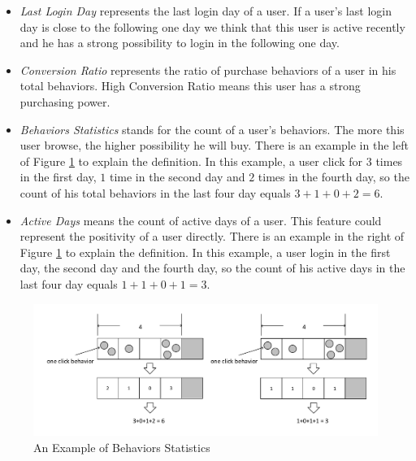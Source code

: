 \documentclass{llncs}
\begin{document}
\begin{itemize}
	\item \emph{Last Login Day} represents the last login day of a user.
	If a user's last login day is close to the following one day
	we think that this user is active recently
	and he has a strong possibility to login in the following one day.
	
	\item \emph{Conversion Ratio} represents the ratio of purchase behaviors of a user
	in his total behaviors. High Conversion Ratio means this user
	has a strong purchasing power.
	
	\item \emph{Behaviors Statistics} stands for the count of a user's behaviors.
	The more this user browse, the higher possibility he will buy.
	There is an example in the left of Figure \ref{fig:active} to explain the definition.
	In this example, a user click for $3$ times in the first day, $1$ time in the second day and
	$2$ times in the fourth day, so the count of his total behaviors in the last four day equals
	$3 + 1 + 0 + 2 = 6$.
	
	\item \emph{Active Days} means the count of active days of a user.
	This feature could represent the positivity of a user directly.
	There is an example in the right of Figure \ref{fig:active} to explain the definition.
	In this example, a user login in the first day, the second day and
	the fourth day, so the count of his active days in the last four day equals
	$1 + 1 + 0 + 1 = 3$.
	
\end{itemize}

\begin{figure}[htbp]
	\centering
	\includegraphics[scale=0.5]{images/active.pdf}
	\caption{An Example of Behaviors Statistics}
	\label{fig:active}
\end{figure}
\end{document}
